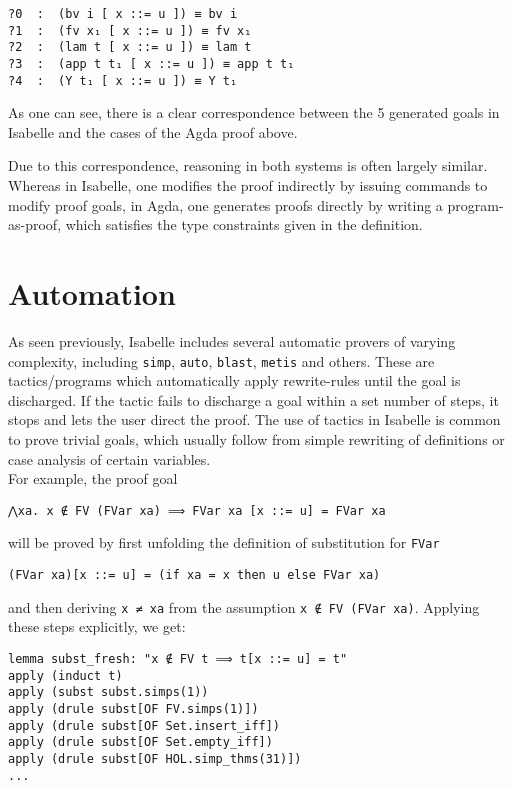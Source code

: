 \documentclass[a4paper, 12pt, twoside]{style/ociamthesis}
\let\OldTexttt\texttt
\renewcommand{\texttt}[1]{\small\OldTexttt{#1}}
\begin{document}
\begin{verbatim}
?0  :  (bv i [ x ::= u ]) ≡ bv i
?1  :  (fv x₁ [ x ::= u ]) ≡ fv x₁
?2  :  (lam t [ x ::= u ]) ≡ lam t
?3  :  (app t t₁ [ x ::= u ]) ≡ app t t₁
?4  :  (Y t₁ [ x ::= u ]) ≡ Y t₁
\end{verbatim}

As one can see, there is a clear correspondence between the 5 generated
goals in Isabelle and the cases of the Agda proof above.

Due to this correspondence, reasoning in both systems is often largely
similar. Whereas in Isabelle, one modifies the proof indirectly by
issuing commands to modify proof goals, in Agda, one generates proofs
directly by writing a program-as-proof, which satisfies the type
constraints given in the definition.

\section{Automation}\label{automation}

As seen previously, Isabelle includes several automatic provers of
varying complexity, including \texttt{simp}, \texttt{auto},
\texttt{blast}, \texttt{metis} and others. These are tactics/programs
which automatically apply rewrite-rules until the goal is discharged. If
the tactic fails to discharge a goal within a set number of steps, it
stops and lets the user direct the proof. The use of tactics in Isabelle
is common to prove trivial goals, which usually follow from simple
rewriting of definitions or case analysis of certain variables.\\
For example, the proof goal

\begin{verbatim}
⋀xa. x ∉ FV (FVar xa) ⟹ FVar xa [x ::= u] = FVar xa
\end{verbatim}

will be proved by first unfolding the definition of substitution for
\texttt{FVar}

\begin{verbatim}
(FVar xa)[x ::= u] = (if xa = x then u else FVar xa)
\end{verbatim}

and then deriving \texttt{x ≠ xa} from the assumption
\texttt{x ∉ FV (FVar xa)}. Applying these steps explicitly, we get:

\begin{verbatim}
lemma subst_fresh: "x ∉ FV t ⟹ t[x ::= u] = t"
apply (induct t)
apply (subst subst.simps(1))
apply (drule subst[OF FV.simps(1)])
apply (drule subst[OF Set.insert_iff])
apply (drule subst[OF Set.empty_iff])
apply (drule subst[OF HOL.simp_thms(31)])
...
\end{verbatim}
\end{document}
